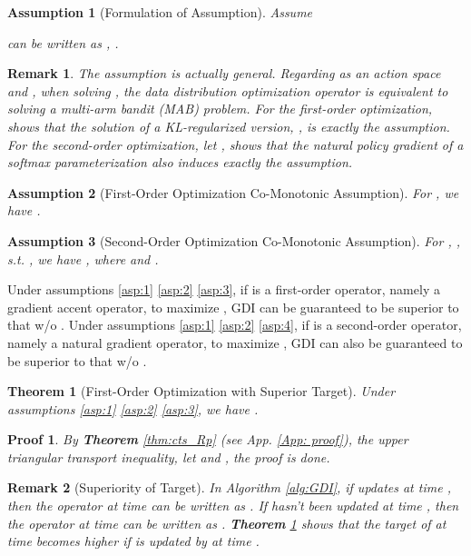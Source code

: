 \documentclass[nohyperref]{article}
\theoremstyle{plain}
\newtheorem{Theorem}{\textbf{Theorem}}
\newtheorem*{Remark}{\textbf{Remark}}
\newtheorem*{Proof}{\textbf{Proof}}
\newtheorem{Assumption}{\textbf{Assumption}}
\begin{document}
\begin{Assumption}[Formulation of  Assumption]
    Assume
    
    can be written as 
    , 
    .
\label{asp:2}
\end{Assumption}
\begin{Remark}
    The assumption is actually general.
    Regarding  as an action space and 
    , when solving , the data distribution optimization operator  is equivalent to solving a multi-arm bandit (MAB) problem.
    For the first-order optimization, \citep{eq_pg_q} shows that the solution of a KL-regularized version, , is exactly the assumption.
    For the second-order optimization, let , \citep{pgtheory} shows that the natural policy gradient of a softmax parameterization also induces exactly the assumption.
\end{Remark}

\begin{Assumption}[First-Order Optimization Co-Monotonic Assumption]
    For , we have
    .
\label{asp:3}
\end{Assumption}

\begin{Assumption}[Second-Order Optimization Co-Monotonic Assumption]
    For ,
    , s.t. , we have
    ,
    where  and
    .
\label{asp:4}
\end{Assumption}

Under assumptions \eqref{asp:1} \eqref{asp:2} \eqref{asp:3}, if  is a first-order operator, namely a gradient accent operator, to maximize , GDI can be guaranteed to be superior to that w/o .
Under assumptions \eqref{asp:1} \eqref{asp:2} \eqref{asp:4}, if  is a second-order operator, namely a natural gradient operator, to maximize , GDI can also be guaranteed to be superior to that w/o .

\begin{Theorem}[First-Order Optimization with Superior Target]
    Under assumptions \eqref{asp:1} \eqref{asp:2} \eqref{asp:3}, we have
    .
\label{thm:1st_gdi}
\end{Theorem}

\begin{Proof}
    By \textbf{Theorem} \ref{thm:cts_Rp} (see App. \ref{App: proof}), the upper triangular transport inequality, 
    let  and 
    ,
    the proof is done.
\end{Proof}

\begin{Remark}[Superiority of Target]
     In Algorithm \ref{alg:GDI}, if  updates  at time , then the operator  at time  can be written as .
     If  hasn't been updated at time , then the operator  at time  can be written as .
     \textbf{Theorem} \ref{thm:1st_gdi} shows that the target of  at time  becomes higher if  is updated by  at time .
\end{Remark}
\end{document}
